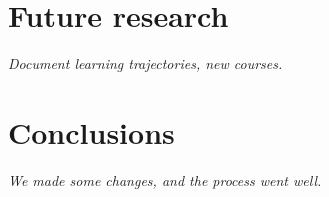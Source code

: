 \documentclass[english,aps,pra,reprint,noshowpacs,superscriptaddress]{revtex4-1}
\begin{document}
\section{Future research}
\emph{Document learning trajectories, new courses.}



\section{Conclusions}
\emph{We made some changes, and the process went well.}


\end{document}
